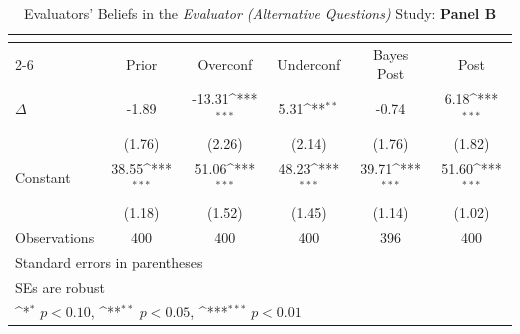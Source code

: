 \begin{table}[htbp]\centering
\def\sym#1{\ifmmode^{#1}\else\(^{#1}\)\fi}
\caption{Evaluators' Beliefs in the \textit{Evaluator (Alternative Questions)} Study: \textbf{Panel B}}
\begin{tabular}{l*{5}{c}}
\hline\hline
                &\multicolumn{5}{c}{}                                                                          \\\cmidrule(lr){2-6}
                &\multicolumn{1}{c}{Prior}&\multicolumn{1}{c}{Overconf}&\multicolumn{1}{c}{Underconf}&\multicolumn{1}{c}{Bayes Post}&\multicolumn{1}{c}{Post}\\
\hline
$\Delta$        &    -1.89         &   -13.31\sym{***}&     5.31\sym{**} &    -0.74         &     6.18\sym{***}\\
                &   (1.76)         &   (2.26)         &   (2.14)         &   (1.76)         &   (1.82)         \\
Constant        &    38.55\sym{***}&    51.06\sym{***}&    48.23\sym{***}&    39.71\sym{***}&    51.60\sym{***}\\
                &   (1.18)         &   (1.52)         &   (1.45)         &   (1.14)         &   (1.02)         \\
\hline
Observations    &      400         &      400         &      400         &      396         &      400         \\
\hline\hline
\multicolumn{6}{l}{\footnotesize Standard errors in parentheses}\\
\multicolumn{6}{l}{\footnotesize SEs are robust}\\
\multicolumn{6}{l}{\footnotesize \sym{*} \(p<0.10\), \sym{**} \(p<0.05\), \sym{***} \(p<0.01\)}\\
\end{tabular}
\end{table}
